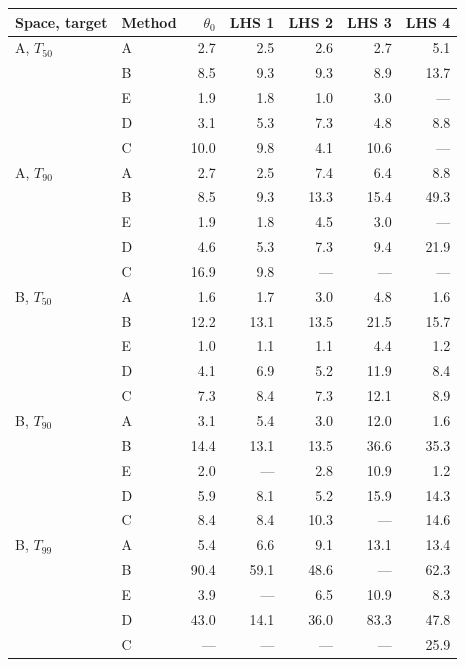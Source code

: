 \begin{tabular}{llrrrrr}\toprule
Space, target & Method & $\theta_0$ & LHS 1 & LHS 2 & LHS 3 & LHS 4\\\midrule
A, $T_{50}$ & A & 2.7 & 2.5 & 2.6 & 2.7 & 5.1\\
 & B & 8.5 & 9.3 & 9.3 & 8.9 & 13.7\\
 & E & 1.9 & 1.8 & 1.0 & 3.0 & ---\\
 & D & 3.1 & 5.3 & 7.3 & 4.8 & 8.8\\
 & C & 10.0 & 9.8 & 4.1 & 10.6 & ---\\
\addlinespace
A, $T_{90}$ & A & 2.7 & 2.5 & 7.4 & 6.4 & 8.8\\
 & B & 8.5 & 9.3 & 13.3 & 15.4 & 49.3\\
 & E & 1.9 & 1.8 & 4.5 & 3.0 & ---\\
 & D & 4.6 & 5.3 & 7.3 & 9.4 & 21.9\\
 & C & 16.9 & 9.8 & --- & --- & ---\\
\addlinespace
B, $T_{50}$ & A & 1.6 & 1.7 & 3.0 & 4.8 & 1.6\\
 & B & 12.2 & 13.1 & 13.5 & 21.5 & 15.7\\
 & E & 1.0 & 1.1 & 1.1 & 4.4 & 1.2\\
 & D & 4.1 & 6.9 & 5.2 & 11.9 & 8.4\\
 & C & 7.3 & 8.4 & 7.3 & 12.1 & 8.9\\
\addlinespace
B, $T_{90}$ & A & 3.1 & 5.4 & 3.0 & 12.0 & 1.6\\
 & B & 14.4 & 13.1 & 13.5 & 36.6 & 35.3\\
 & E & 2.0 & --- & 2.8 & 10.9 & 1.2\\
 & D & 5.9 & 8.1 & 5.2 & 15.9 & 14.3\\
 & C & 8.4 & 8.4 & 10.3 & --- & 14.6\\
\addlinespace
B, $T_{99}$ & A & 5.4 & 6.6 & 9.1 & 13.1 & 13.4\\
 & B & 90.4 & 59.1 & 48.6 & --- & 62.3\\
 & E & 3.9 & --- & 6.5 & 10.9 & 8.3\\
 & D & 43.0 & 14.1 & 36.0 & 83.3 & 47.8\\
 & C & --- & --- & --- & --- & 25.9\\
\bottomrule\end{tabular}

